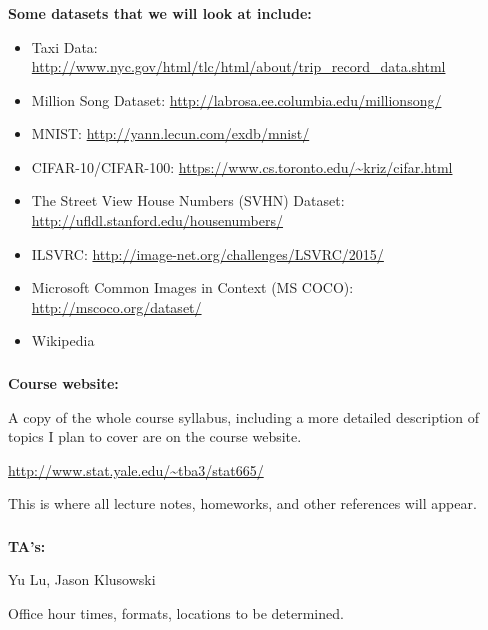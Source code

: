 \documentclass[xetex,mathserif,serif,aspectratio=169]{beamer}
\begin{document}
\begin{frame}[fragile] \frametitle{} \oldB \small

{\bf Some datasets that we will look at include:}

\begin{itemize}\setlength\itemsep{0em}
\item Taxi Data: \url{http://www.nyc.gov/html/tlc/html/about/trip_record_data.shtml}
\item Million Song Dataset: \url{http://labrosa.ee.columbia.edu/millionsong/}
\item MNIST: \url{http://yann.lecun.com/exdb/mnist/}
\item CIFAR-10/CIFAR-100: \url{https://www.cs.toronto.edu/~kriz/cifar.html}
\item The Street View House Numbers (SVHN) Dataset: \url{http://ufldl.stanford.edu/housenumbers/}
\item ILSVRC: \url{http://image-net.org/challenges/LSVRC/2015/}
\item Microsoft Common Images in Context (MS COCO): \url{http://mscoco.org/dataset/}
\item Wikipedia
\end{itemize}

\end{frame}

\begin{frame}[fragile] \frametitle{} \oldB \small

{\bf Course website:}

A copy of the whole course syllabus, including a more detailed description
of topics I plan to cover are on the course website.

\begin{center}
\url{http://www.stat.yale.edu/~tba3/stat665/}
\end{center}

This is where all lecture notes, homeworks, and other references will appear.

\end{frame}

\begin{frame}[fragile] \frametitle{} \oldB \small

{\bf TA's:}

Yu Lu, Jason Klusowski

Office hour times, formats, locations to be determined.

\end{frame}
\end{document}
